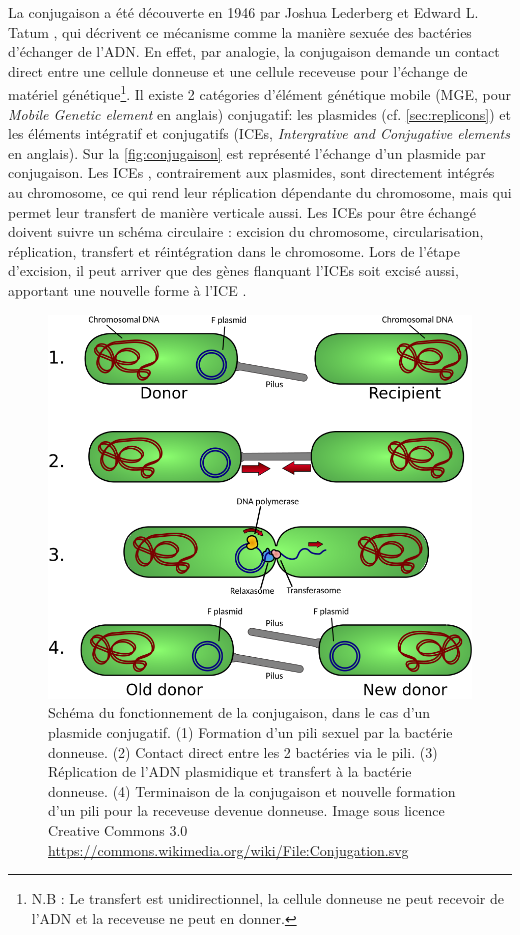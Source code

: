 La conjugaison a été découverte en 1946 par Joshua Lederberg et Edward L. Tatum \cite{lederberg_sex_1953}, qui décrivent ce mécanisme comme la manière sexuée des bactéries d'échanger de l'ADN. En effet, par analogie, la conjugaison demande un contact direct entre une cellule donneuse et une cellule receveuse pour l'échange de matériel génétique\footnote{N.B : Le transfert est unidirectionnel, la cellule donneuse ne peut recevoir de l'ADN et la receveuse ne peut en donner.}. Il existe 2 catégories d'élément génétique mobile (MGE, pour \textit{Mobile Genetic element} en anglais) conjugatif: les plasmides (cf. \autoref{sec:replicons}) et les éléments intégratif et conjugatifs (ICEs, \textit{Intergrative and Conjugative elements} en anglais). Sur la \autoref{fig:conjugaison} est représenté l'échange d'un plasmide par conjugaison. Les ICEs \cite{johnson_integrative_2015}, contrairement aux plasmides, sont directement intégrés au chromosome, ce qui rend leur réplication dépendante du chromosome, mais qui permet leur transfert de manière verticale aussi. Les ICEs pour être échangé doivent suivre un schéma circulaire : excision du chromosome, circularisation, réplication, transfert et réintégration dans le chromosome. Lors de l'étape d'excision, il peut arriver que des gènes flanquant l'ICEs soit excisé aussi, apportant une nouvelle forme à l'ICE \cite{gibbons_genomic_2011}.

\begin{figure}[htbp]
    \centering
    \includegraphics[width=0.8\linewidth]{images/Conjugation.png}
    \caption[Schéma du fonctionnement de la conjugaison]{Schéma du fonctionnement de la conjugaison, dans le cas d'un plasmide conjugatif. (1) Formation d'un pili sexuel par la bactérie donneuse. (2) Contact direct entre les 2 bactéries via le pili. (3) Réplication de l'ADN plasmidique et transfert à la bactérie donneuse. (4) Terminaison de la conjugaison et nouvelle formation d'un pili pour la receveuse devenue donneuse. Image sous licence Creative Commons 3.0 \url{https://commons.wikimedia.org/wiki/File:Conjugation.svg}}
    \label{fig:conjugaison}
\end{figure}


